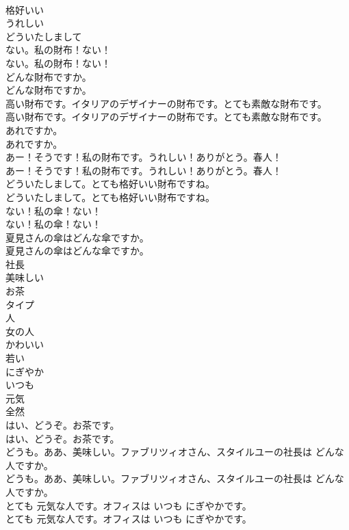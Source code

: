 \documentclass[8pt]{extreport}
\begin{document}
\begin{CJK}{UTF8}{min}
\\	格好いい
\\	うれしい
\\	どういたしまして
\\	ない。私の財布！ない！	
\\	ない。私の財布！ない！ 
\\	どんな財布ですか。	
\\	どんな財布ですか。 
\\	高い財布です。イタリアのデザイナーの財布です。とても素敵な財布です。	
\\	高い財布です。イタリアのデザイナーの財布です。とても素敵な財布です。 
\\	あれですか。	
\\	あれですか。 
\\	あー！そうです！私の財布です。うれしい！ありがとう。春人！	
\\	あー！そうです！私の財布です。うれしい！ありがとう。春人！ 
\\	どういたしまして。とても格好いい財布ですね。	
\\	どういたしまして。とても格好いい財布ですね。 
\\	ない！私の傘！ない！	
\\	ない！私の傘！ない！ 
\\	夏見さんの傘はどんな傘ですか。	
\\	夏見さんの傘はどんな傘ですか。 
\\	社長
\\	美味しい
\\	お茶
\\	タイプ
\\	人
\\	女の人
\\	かわいい
\\	若い
\\	にぎやか
\\	いつも
\\	元気
\\	全然
\\	はい、どうぞ。お茶です。	
\\	はい、どうぞ。お茶です。 
\\	どうも。ああ、美味しい。ファブリツィオさん、スタイルユーの社長は どんな人ですか。	
\\	どうも。ああ、美味しい。ファブリツィオさん、スタイルユーの社長は どんな人ですか。 
\\	とても 元気な人です。オフィスは いつも にぎやかです。	
\\	とても 元気な人です。オフィスは いつも にぎやかです。 

\end{CJK}
\end{document}
